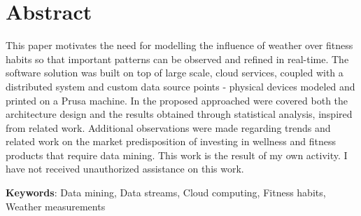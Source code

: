 \chapter*{Abstract}
\pagestyle{fancy}
\label{abstract}

This paper motivates the need for modelling the influence of weather over fitness habits so that important patterns can be observed and refined in real-time. The software solution was built on top of large scale, cloud services, coupled with a distributed system and custom data source points - physical devices modeled and printed on a Prusa machine. In the proposed approached were covered both the architecture design and the results obtained through statistical analysis, inspired from related work. Additional observations were made regarding trends and related work on the market predisposition of investing in wellness and fitness products that require data mining. This work is the result of my own activity. I have not received unauthorized assistance on this work.

\vspace{5mm}

\textbf{Keywords}: Data mining, Data streams, Cloud computing, Fitness habits, Weather measurements

\lhead{}